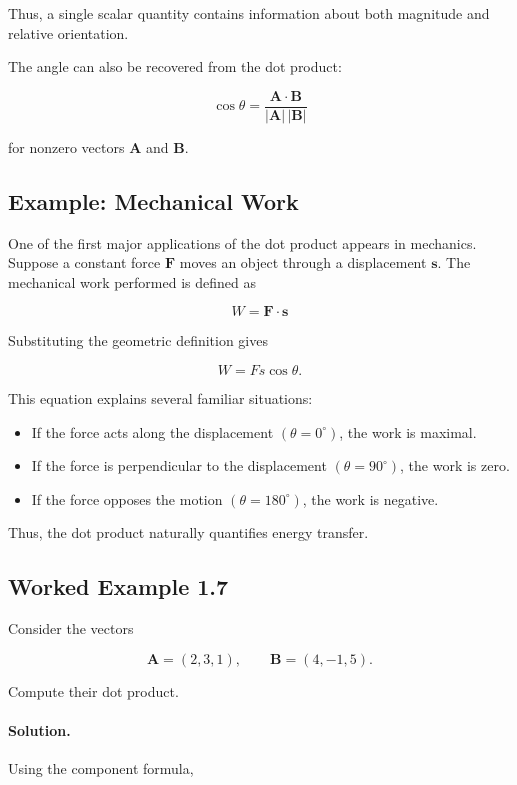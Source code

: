 Thus, a single scalar quantity contains information about both magnitude and
relative orientation.

The angle can also be recovered from the dot product:

\[
\boxed{
\cos\theta
=
\frac{\mathbf A\cdot\mathbf B}
{\lvert\mathbf A\rvert\,\lvert\mathbf B\rvert}
}
\]

for nonzero vectors $\mathbf A$ and $\mathbf B$.

\subsection{Example: Mechanical Work}

One of the first major applications of the dot product appears in mechanics.
Suppose a constant force $\mathbf F$ moves an object through a displacement
$\mathbf s$. The mechanical work performed is defined as

\[
\boxed{
W=\mathbf F\cdot\mathbf s
}
\]

Substituting the geometric definition gives

\[
W=Fs\cos\theta.
\]

This equation explains several familiar situations:

\begin{itemize}
  \item If the force acts along the displacement $(\theta=0^{\circ})$, the work
  is maximal.
  \item If the force is perpendicular to the displacement
  $(\theta=90^{\circ})$, the work is zero.
  \item If the force opposes the motion $(\theta=180^{\circ})$, the work is
  negative.
\end{itemize}

Thus, the dot product naturally quantifies energy transfer.

\subsection{Worked Example 1.7}

Consider the vectors

\[
\mathbf A=(2,3,1),
\qquad
\mathbf B=(4,-1,5).
\]

Compute their dot product.

\paragraph{Solution.}
Using the component formula,

